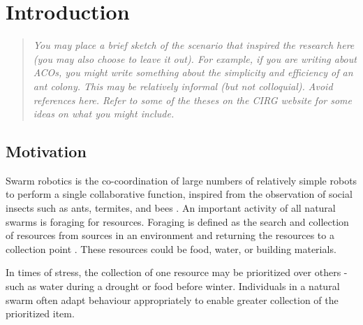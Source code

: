 
\chapter{Introduction}
\label{chap:introduction}
\pagestyle{headings}
\setcounter{page}{1}


\begin{quote}
	{\it You may place a brief sketch of the scenario that inspired the research here (you may also choose to leave it out). For example, if you are writing about ACOs, you might write something about the simplicity and efficiency of an ant colony. This may be relatively informal (but not colloquial). Avoid references here. Refer to some of the theses on the CIRG website for some ideas on what you might include.}
\end{quote}



\section{Motivation}
\label{sec:introduction:motivation}

Swarm robotics is the co-coordination of large numbers of  relatively simple robots to perform a single collaborative function, inspired from the observation of social insects such as ants, termites, and bees \cite{dorigo2004swarm}. An important activity of all natural swarms is foraging for resources. Foraging is defined as the search and collection of resources from sources in an environment and returning the resources to a collection point \cite{winfield2009foraging}. These resources could be food, water, or building materials. %

In times of stress, the collection of one resource may be prioritized over others - such as water during a drought or food before winter. Individuals in a natural swarm often adapt behaviour appropriately to enable greater collection of the prioritized item.

